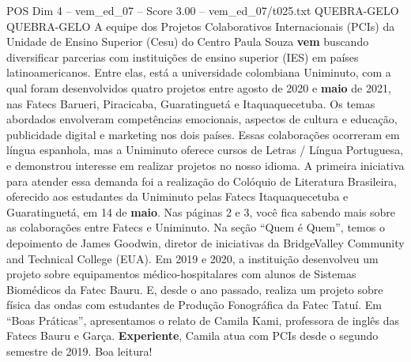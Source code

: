 \begin{textsample}{POS Dim 4 – vem\_ed\_07 – Score 3.00 – vem\_ed\_07/t025.txt}  \label{ex:f4_pos_039}
QUEBRA-GELO QUEBRA-GELO A equipe dos Projetos Colaborativos Internacionais (PCIs) da Unidade de Ensino Superior (Cesu) do Centro Paula Souza \textbf{vem} buscando diversificar parcerias com instituições de ensino superior (IES) em países latinoamericanos.
Entre elas, está a universidade colombiana Uniminuto, com a qual foram desenvolvidos quatro projetos entre agosto de 2020 e \textbf{maio} de 2021, nas Fatecs Barueri, Piracicaba, Guaratinguetá e Itaquaquecetuba.
Os temas abordados envolveram competências emocionais, aspectos de cultura e educação, publicidade digital e marketing nos dois países.
Essas colaborações ocorreram em língua espanhola, mas a Uniminuto oferece cursos de Letras / Língua Portuguesa, e demonstrou interesse em realizar projetos no nosso idioma.
A primeira iniciativa para atender essa demanda foi a realização do Colóquio de Literatura Brasileira, oferecido aos estudantes da Uniminuto pelas Fatecs Itaquaquecetuba e Guaratinguetá, em 14 de \textbf{maio}.
Nas páginas 2 e 3, você fica sabendo mais sobre as colaborações entre Fatecs e Uniminuto.
Na seção “Quem é Quem”, temos o depoimento de James Goodwin, diretor de iniciativas da BridgeValley Community and Technical College (EUA).
Em 2019 e 2020, a instituição desenvolveu um projeto sobre equipamentos médico-hospitalares com alunos de Sistemas Biomédicos da Fatec Bauru.
E, desde o ano passado, realiza um projeto sobre física das ondas com estudantes de Produção Fonográfica da Fatec Tatuí.
Em “Boas Práticas”, apresentamos o relato de Camila Kami, professora de inglês das Fatecs Bauru e Garça. \textbf{Experiente}, Camila atua com PCIs desde o segundo semestre de 2019.
Boa leitura!

\end{textsample}
